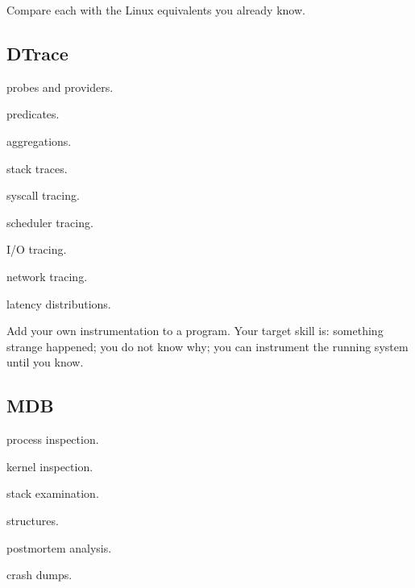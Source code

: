 \documentclass[11pt,letterpaper]{article}
\begin{document}
Compare each with the Linux equivalents you already know.

\subsection*{DTrace}

\begin{topics}

\item probes and providers.

\item predicates.

\item aggregations.

\item stack traces.

\item syscall tracing.

\item scheduler tracing.

\item I/O tracing.

\item network tracing.

\item latency distributions.

\end{topics}

Add your own instrumentation to a program. Your target skill is: something strange happened; you do not know why; you can instrument the running system until you know.

\subsection*{MDB}

\begin{topics}

\item process inspection.

\item kernel inspection.

\item stack examination.

\item structures.

\item postmortem analysis.

\item crash dumps.

\end{topics}
\end{document}
